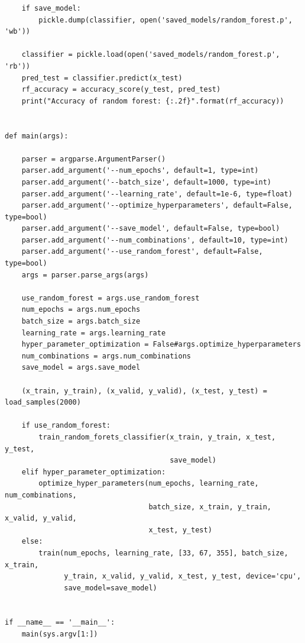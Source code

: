 \documentclass[aps,prb,10pt,twocolumn,groupedaddress]{revtex4-1}
\begin{document}
\begin{lstlisting}
	if save_model:
		pickle.dump(classifier, open('saved_models/random_forest.p', 'wb'))

	classifier = pickle.load(open('saved_models/random_forest.p', 'rb'))
	pred_test = classifier.predict(x_test)
	rf_accuracy = accuracy_score(y_test, pred_test)
	print("Accuracy of random forest: {:.2f}".format(rf_accuracy))


def main(args):

	parser = argparse.ArgumentParser()
	parser.add_argument('--num_epochs', default=1, type=int)
	parser.add_argument('--batch_size', default=1000, type=int)
	parser.add_argument('--learning_rate', default=1e-6, type=float)
	parser.add_argument('--optimize_hyperparameters', default=False, type=bool)
	parser.add_argument('--save_model', default=False, type=bool)
	parser.add_argument('--num_combinations', default=10, type=int)
	parser.add_argument('--use_random_forest', default=False, type=bool)
	args = parser.parse_args(args)

	use_random_forest = args.use_random_forest
	num_epochs = args.num_epochs
	batch_size = args.batch_size
	learning_rate = args.learning_rate
	hyper_parameter_optimization = False#args.optimize_hyperparameters
	num_combinations = args.num_combinations
	save_model = args.save_model

	(x_train, y_train), (x_valid, y_valid), (x_test, y_test) = load_samples(2000)

	if use_random_forest:
		train_random_forets_classifier(x_train, y_train, x_test, y_test,
		                               save_model)
	elif hyper_parameter_optimization:
		optimize_hyper_parameters(num_epochs, learning_rate, num_combinations,
		                          batch_size, x_train, y_train, x_valid, y_valid,
		                          x_test, y_test)
	else:
		train(num_epochs, learning_rate, [33, 67, 355], batch_size, x_train,
		      y_train, x_valid, y_valid, x_test, y_test, device='cpu',
		      save_model=save_model)


if __name__ == '__main__':
	main(sys.argv[1:])
\end{lstlisting}
\end{document}
